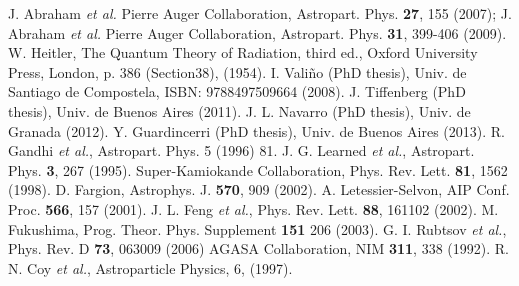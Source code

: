 \begin{thebibliography}{1}
J. Abraham {\it et al.} Pierre Auger Collaboration, Astropart. Phys. \textbf{27}, 155 (2007);
J. Abraham {\it et al.} Pierre Auger Collaboration, Astropart. Phys. {\bf 31}, 399-406 (2009).
 W. Heitler, The Quantum Theory of Radiation, third ed., Oxford University Press, London, p. 386 (Section38), (1954).
 I. Vali\~no (PhD thesis), Univ. de Santiago de Compostela, ISBN: 9788497509664 (2008).
 J. Tiffenberg (PhD thesis), Univ. de Buenos Aires (2011).
 J. L. Navarro (PhD thesis), Univ. de Granada (2012).
 Y. Guardincerri (PhD thesis), Univ. de Buenos Aires (2013).
 R. Gandhi {\it et al.}, Astropart. Phys. 5 (1996) 81.
 J. G. Learned {\it et al.}, Astropart. Phys. \textbf{3}, 267 (1995).
 Super-Kamiokande Collaboration, Phys. Rev. Lett. \textbf{81}, 1562 (1998). 
 D. Fargion, Astrophys. J. \textbf{570}, 909 (2002).
 A. Letessier-Selvon, AIP Conf. Proc. \textbf{566}, 157 (2001).
 J. L. Feng {\it et al.}, Phys. Rev. Lett. \textbf{88}, 161102 (2002).
 M. Fukushima, Prog. Theor. Phys. Supplement \textbf{151} 206 (2003). 
 G. I. Rubtsov {\it et al.}, Phys. Rev. D \textbf{73}, 063009 (2006)
 AGASA Collaboration, NIM \textbf{311}, 338 (1992).
 R. N. Coy {\it et al.}, Astroparticle Physics, 6, (1997).


\end{thebibliography}
